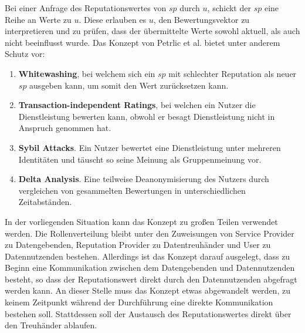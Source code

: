 \documentclass{scrreprt}
\begin{document}
Bei einer Anfrage des Reputationswertes von $sp$ durch $u$, schickt der $sp$ eine Reihe an Werte zu $u$. Diese erlauben es $u$, den Bewertungsvektor zu interpretieren und zu prüfen, dass der übermittelte Werte sowohl aktuell, als auch nicht beeinflusst wurde. 
Das Konzept von Petrlic et al. bietet unter anderem Schutz vor: 
\begin{enumerate}
    \item \textbf{Whitewashing}, bei welchem sich ein $sp$ mit schlechter Reputation als neuer $sp$ ausgeben kann, um somit den Wert zurücksetzen kann.
    \item \textbf{Transaction-independent Ratings}, bei welchen ein Nutzer die Dienstleistung bewerten kann, obwohl er besagt Dienstleistung nicht in Anspruch genommen hat.
    \item \textbf{Sybil Attacks}. Ein Nutzer bewertet eine Dienstleistung unter mehreren Identitäten und täuscht so seine Meinung als Gruppenmeinung vor.
    \item \textbf{Delta Analysis}. Eine teilweise Deanonymisierung des Nutzers durch vergleichen von gesammelten Bewertungen in unterschiedlichen Zeitabständen.
\end{enumerate} 
In der vorliegenden Situation kann das Konzept zu großen Teilen verwendet werden. Die Rollenverteilung bleibt unter den Zuweisungen von Service Provider zu Datengebenden, Reputation Provider zu Datentreuhänder und User zu Datennutzenden bestehen. Allerdings ist das Konzept darauf ausgelegt, dass zu Beginn eine Kommunikation zwischen dem Datengebenden und Datennutzenden besteht, so dass der Reputationswert direkt durch den Datennutzenden abgefragt werden kann. An dieser Stelle muss das Konzept etwas abgewandelt werden, zu keinem Zeitpunkt während der Durchführung eine direkte Kommunikation bestehen soll. Stattdessen soll der Austausch des Reputationswertes direkt über den Treuhänder ablaufen.
\end{document}
